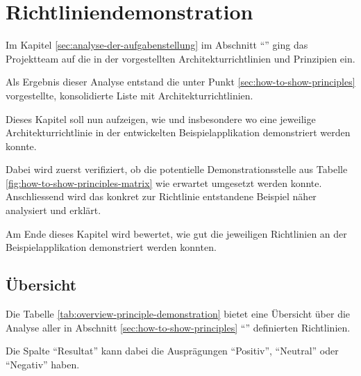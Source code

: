 \chapter{Richtliniendemonstration}

Im Kapitel \ref{sec:analyse-der-aufgabenstellung} im Abschnitt ``'' ging das Projektteam auf die in der  vorgestellten Architekturrichtlinien und Prinzipien ein.

Als Ergebnis dieser Analyse entstand die unter Punkt \ref{sec:how-to-show-principles} vorgestellte, konsolidierte Liste mit Architekturrichtlinien.

Dieses Kapitel soll nun aufzeigen, wie und insbesondere wo eine jeweilige Architekturrichtlinie in der entwickelten Beispielapplikation demonstriert werden konnte.

Dabei wird zuerst verifiziert, ob die potentielle Demonstrationsstelle aus Tabelle \ref{fig:how-to-show-principles-matrix} wie erwartet umgesetzt werden konnte.
Anschliessend wird das konkret zur Richtlinie entstandene Beispiel näher analysiert und erklärt.

Am Ende dieses Kapitel wird bewertet, wie gut die jeweiligen Richtlinien an der Beispielapplikation demonstriert werden konnten.

\newpage
\section{Übersicht}

Die Tabelle \ref{tab:overview-principle-demonstration} bietet eine Übersicht über die Analyse aller in Abschnitt \ref{sec:how-to-show-principles} ``'' definierten Richtlinien.

Die Spalte ``Resultat'' kann dabei die Ausprägungen ``Positiv'', ``Neutral'' oder ``Negativ'' haben.

